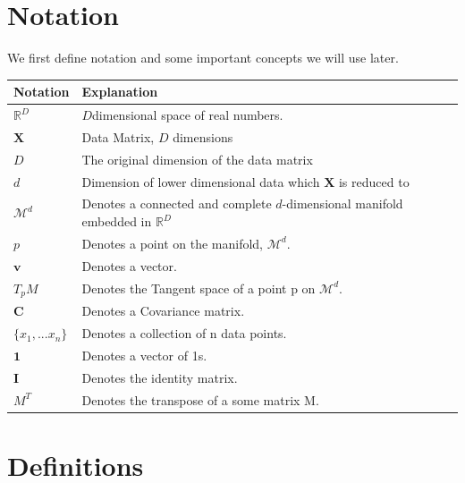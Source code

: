 \documentclass[12pt]{report}
\begin{document}
\newpage

\section{Notation}

We first define notation and some important concepts we will use later.

\begin{table}[h]
\begin{tabular}{|l|l|}
\hline
\textbf{Notation} & \textbf{Explanation}                                      \\ \hline
$\mathbb{R}^D$    &$D$dimensional space of real numbers.                      \\ \hline
$\textbf{X}$        & Data Matrix, $D$ dimensions                                 \\ \hline
$D$                & The original dimension of the data matrix                 \\ \hline
$d$               & Dimension of lower dimensional data which $\textbf{X}$ is reduced to \\ \hline
$\mathcal{M}^d$      & Denotes a connected and complete $d$-dimensional manifold
                   embedded in $\mathbb{R}^D$                                 \\ \hline
$p$               & Denotes a point on the manifold, $\mathcal{M}^d$.            \\ \hline
$\textbf{v}$        & Denotes a vector.                                         \\ \hline
$T_pM$            & Denotes the Tangent space of a point p on $\mathcal{M}^d$.   \\ \hline
$\textbf{C}$        & Denotes a Covariance matrix.                               \\ \hline
$\{x_1,...x_n\}$  & Denotes a collection of n data points.        \\ \hline
$\mathbf{1}$      & Denotes a vector of 1s.                                   \\ \hline
$\textbf{I}$      & Denotes the identity matrix.                               \\ \hline
$M^T$             & Denotes the transpose of a some matrix M.                 \\ \hline
\end{tabular}
\end{table}

\newpage

\section{Definitions}
\end{document}
